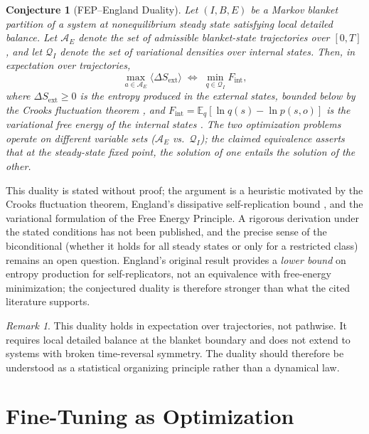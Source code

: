\documentclass[12pt,a4paper]{article}
\newtheorem{conjecture}{Conjecture}
\theoremstyle{remark}
\newtheorem{remark}{Remark}
\begin{document}
\begin{conjecture}[FEP--England Duality]\label{lem:fep-england}
Let $(I, B, E)$ be a Markov blanket partition of a system at nonequilibrium steady state satisfying local detailed balance. Let $\mathcal{A}_E$ denote the set of admissible blanket-state trajectories over $[0, T]$, and let $\mathcal{Q}_I$ denote the set of variational densities over internal states. Then, in expectation over trajectories,
\[
  \max_{a \in \mathcal{A}_E} \langle \Delta S_{\mathrm{ext}} \rangle \;\Longleftrightarrow\; \min_{q \in \mathcal{Q}_I} F_{\mathrm{int}},
\]
where $\Delta S_{\mathrm{ext}} \geq 0$ is the entropy produced in the external states, bounded below by the Crooks fluctuation theorem \citep{Crooks1999}, and $F_{\mathrm{int}} = \mathbb{E}_q[\ln q(s) - \ln p(s,o)]$ is the variational free energy of the internal states \citep{FristonFreeEnergy}. The two optimization problems operate on \emph{different} variable sets ($\mathcal{A}_E$ vs.\ $\mathcal{Q}_I$); the claimed equivalence asserts that at the steady-state fixed point, the solution of one entails the solution of the other.
\end{conjecture}

This duality is stated without proof; the argument is a heuristic motivated by the Crooks fluctuation theorem, England's dissipative self-replication bound \citep{England2013}, and the variational formulation of the Free Energy Principle. A rigorous derivation under the stated conditions has not been published, and the precise sense of the biconditional (whether it holds for all steady states or only for a restricted class) remains an open question. England's original result provides a \emph{lower bound} on entropy production for self-replicators, not an equivalence with free-energy minimization; the conjectured duality is therefore stronger than what the cited literature supports.

\begin{remark}
This duality holds in expectation over trajectories, not pathwise. It requires local detailed balance at the blanket boundary and does not extend to systems with broken time-reversal symmetry. The duality should therefore be understood as a statistical organizing principle rather than a dynamical law.
\end{remark}

\section{Fine-Tuning as Optimization}
\label{sec:finetuning}
\end{document}
